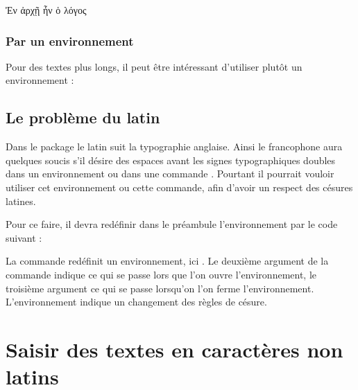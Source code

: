 \begin{latexcode}
\textgreek[variant=ancient]{Ἐν ἀρχῇ ἦν ὁ λόγος}
\end{latexcode}

\subsubsection{Par un environnement}

Pour des textes plus longs, il peut être intéressant d'utiliser plutôt un environnement :


\subsection{Le problème du latin}\label{redefinirlatin}

Dans le package  le latin suit la typographie anglaise. Ainsi le francophone aura quelques soucis s'il désire des espaces avant les signes typographiques doubles dans un environnement  ou dans une commande .
Pourtant il pourrait vouloir utiliser cet environnement ou cette commande, afin d'avoir un respect des césures latines.

Pour ce faire, il devra redéfinir dans le préambule l'environnement  par le code suivant :

\begin{latexcode}
\renewenvironment{latin}{\begin{hyphenrules}{latin}}%
{\end{hyphenrules}}
\end{latexcode}

\begin{plusloins}
La commande  redéfinit un environnement, ici . Le deuxième argument de la commande indique ce qui se passe lors que l'on ouvre l'environnement, le troisième argument ce qui se passe lorsqu'on l'on ferme l'environnement. L'environnement  indique un changement des règles de césure.
\end{plusloins}


\section{Saisir des textes en caractères non latins}\label{utf8}

